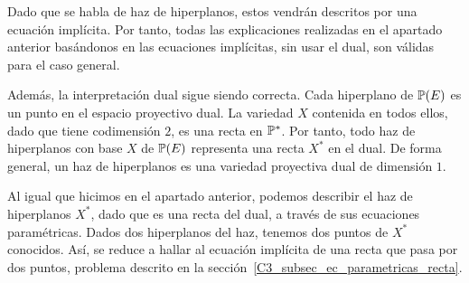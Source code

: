 Dado que se habla de haz de hiperplanos, estos vendrán descritos por una ecuación implícita. Por tanto, todas las explicaciones realizadas en el apartado anterior basándonos en las ecuaciones implícitas, sin usar el dual, son válidas para el caso general.

Además, la interpretación dual sigue siendo correcta. Cada hiperplano de $\mathbb{P}(E)$ es un punto en el espacio proyectivo dual. La variedad $X$ contenida en todos ellos, dado que tiene codimensión $2$, es una recta en $\mathbb{P}^*$. Por tanto, todo haz de hiperplanos con base $X$ de $\mathbb{P}(E)$ representa una recta $X^*$ en el dual. De forma general, un haz de hiperplanos es una variedad proyectiva dual de dimensión $1$. 

Al igual que hicimos en el apartado anterior, podemos describir el haz de hiperplanos $X^*$, dado que es una recta del dual, a través de sus ecuaciones paramétricas. Dados dos hiperplanos del haz, tenemos dos puntos de $X^*$ conocidos. Así, se reduce a hallar al ecuación implícita de una recta que pasa por dos puntos, problema descrito en la sección~\ref{C3_subsec_ec_parametricas_recta}.

